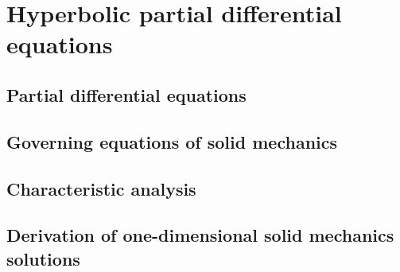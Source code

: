 \chapter{Hyperbolic partial differential equations}
\newpage
\section{Partial differential equations}
\label{sec:PDEs}


\section{Governing equations of solid mechanics}
\label{sec:solidMech_equations}



\section{Characteristic analysis}
\label{sec:characteristic_analysis}



\section{Derivation of one-dimensional solid mechanics solutions}
\label{sec:analytical_results}
%




